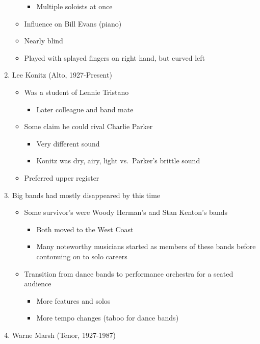 \documentclass[]{article}
\providecommand{\tightlist}{%
  \setlength{\itemsep}{0pt}\setlength{\parskip}{0pt}}
\begin{document}
\begin{enumerate}
\begin{itemize}
    \begin{itemize}
    \tightlist
    \item
      Multiple soloists at once
    \end{itemize}
  \item
    Influence on Bill Evans (piano)
  \item
    Nearly blind
  \item
    Played with splayed fingers on right hand, but curved left
  \end{itemize}
\item
  Lee Konitz (Alto, 1927-Present)

  \begin{itemize}
  \tightlist
  \item
    Was a student of Lennie Tristano

    \begin{itemize}
    \tightlist
    \item
      Later colleague and band mate
    \end{itemize}
  \item
    Some claim he could rival Charlie Parker

    \begin{itemize}
    \tightlist
    \item
      Very different sound
    \item
      Konitz was dry, airy, light vs.~Parker's brittle sound
    \end{itemize}
  \item
    Preferred upper register
  \end{itemize}
\item
  Big bands had mostly disappeared by this time

  \begin{itemize}
  \tightlist
  \item
    Some survivor's were Woody Herman's and Stan Kenton's bands

    \begin{itemize}
    \tightlist
    \item
      Both moved to the West Coast
    \item
      Many noteworthy musicians started as members of these bands before
      contonuing on to solo careers
    \end{itemize}
  \item
    Transition from dance bands to performance orchestra for a seated
    audience

    \begin{itemize}
    \tightlist
    \item
      More features and solos
    \item
      More tempo changes (taboo for dance bands)
    \end{itemize}
  \end{itemize}
\item
  Warne Marsh (Tenor, 1927-1987)


\end{enumerate}
\end{document}
